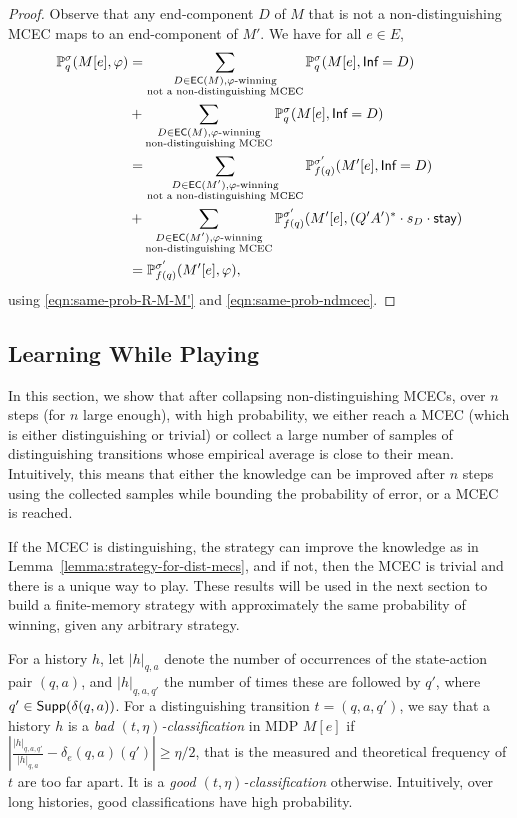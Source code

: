 \documentclass[a4paper,USenglish,cleveref, autoref, thm-restate]{lipics-v2021}
\def\abs#1{\ensuremath{\lvert #1 \rvert}}
\newcommand*{\pr}{\mathbb{P}}
\newcommand\Supp{\textrm{\sf Supp}}
\newcommand\ecs{\textrm{\sf EC}}
\newcommand\Inf{\textrm{\sf Inf}}
\def\actionstay{\textrm{\sf stay}}
\begin{document}
\begin{proof}
  Observe that any end-component $D$ of $M$ that is not a non-distinguishing MCEC maps to an end-component of $M'$.
  We have for all $e\in E$,
  \begin{align*}
    \pr_q^\sigma(M[e], \varphi) &= \sum_{\substack{D \in \ecs(M), \text{$\varphi$-winning} \\\text{not a non-distinguishing MCEC}}}
    \pr_{q}^{\sigma}(M[e], \Inf=D)
    \\& + \sum_{\substack{D \in \ecs(M), \text{$\varphi$-winning}\\\text{non-distinguishing MCEC}}}
                                    \pr_{q}^{\sigma}(M[e], \Inf=D)
    \\&=\sum_{\substack{D \in \ecs(M'), \text{$\varphi$-winning}\\\text{not a non-distinguishing MCEC}}}
    \pr_{f(q)}^{\sigma'}(M'[e], \Inf=D)
    \\&+\sum_{\substack{D \in \ecs(M'), \text{$\varphi$-winning}\\\text{non-distinguishing MCEC}}}
    \pr_{f(q)}^{\sigma'}(M'[e], (Q'A')^*\cdot s_D \cdot \actionstay )\\
    &=\pr_{f(q)}^{\sigma'}(M'[e], \varphi),
  \end{align*}
  using \eqref{eqn:same-prob-R-M-M'} and \eqref{eqn:same-prob-ndmcec}.
\end{proof}

\subsection{Learning While Playing}
\label{section:learning-while-playing}
In this section, we show that after collapsing non-distinguishing MCECs, over $n$ steps (for $n$ large enough),
with high probability,
we either reach a 
MCEC (which is either distinguishing or trivial) 
or collect a large number of samples of distinguishing transitions whose empirical average is close to their mean.
Intuitively, this means that either the knowledge can be improved after $n$ steps using the collected samples while bounding the probability of error, or a 
MCEC is reached. 

If the MCEC is distinguishing, the strategy can improve the knowledge as in Lemma~\ref{lemma:strategy-for-dist-mecs},
and if not, then the MCEC is trivial and there is a unique way to play.
These results will be used in the next section to build a finite-memory strategy with approximately the same probability of winning,
given any arbitrary strategy.

For a history $h$, let $\abs{h}_{q,a}$ denote the number of occurrences of the state-action pair $(q,a)$,
and $\abs{h}_{q,a,q'}$ the number of times these are followed by $q'$, where $q' \in\Supp(\delta(q,a))$.
For a distinguishing transition $t=(q,a,q')$, we say that a history $h$ is a
\emph{bad $(t,\eta)$-classification} in MDP $M[e]$ if 
$\left\lvert\frac{\abs{h}_{q,a,q'}}{\abs{h}_{q,a}} - \delta_{e}(q,a)(q')\right\rvert \geq \eta/2$, that is the measured and theoretical frequency of $t$ are too far apart.
It is a \emph{good $(t,\eta)$-classification} otherwise.
Intuitively, over long histories, good classifications have high probability.
\end{document}

